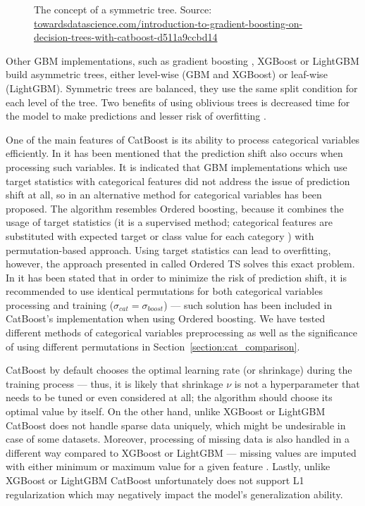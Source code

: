\documentclass[magisterska, english]{pwr_wmat_praca_dyplomowa}
\theoremstyle{plain}
\numberwithin{theorem}{chapter}
\theoremstyle{definition}
\numberwithin{theorem}{chapter}
\begin{document}
\begin{figure}[H]
	\centering
	\caption{The concept of a symmetric tree. Source: \url{towardsdatascience.com/introduction-to-gradient-boosting-on-decision-trees-with-catboost-d511a9ccbd14}}
	\label{fig:symmetric_trees}
\end{figure}

Other GBM implementations, such as gradient boosting \cite{friedman_gbm}, XGBoost \cite{xgboost} or LightGBM \cite{lightgbm} build asymmetric trees, either level-wise (GBM and XGBoost) or leaf-wise (LightGBM). Symmetric trees are balanced, they use the same split condition for each level of the tree. Two benefits of using oblivious trees is decreased time for the model to make predictions and lesser risk of overfitting \cite{catboost}. 

One of the main features of CatBoost is its ability to process categorical variables efficiently. In \cite{catboost} it has been mentioned that the prediction shift also occurs when processing such variables. It is indicated that GBM implementations which use target statistics with categorical features did not address the issue of prediction shift at all, so in \cite{catboost} an alternative method for categorical variables has been proposed. The algorithm resembles Ordered boosting, because it combines the usage of target statistics (it is a supervised method; categorical features are substituted with expected target or class value for each category \cite{comparative_analysis}) with permutation-based approach. Using target statistics can lead to overfitting, however, the approach presented in \cite{catboost} called Ordered TS solves this exact problem. In \cite{catboost} it has been stated that in order to minimize the risk of prediction shift, it is recommended to use identical permutations for both categorical variables processing and training ($\sigma_{cat} = \sigma_{boost}$) --- such solution has been included in CatBoost's implementation when using Ordered boosting. We have tested different methods of categorical variables preprocessing as well as the significance of using different permutations in Section~\ref{section:cat_comparison}.

CatBoost by default chooses the optimal learning rate (or shrinkage) during the training process --- thus, it is likely that shrinkage $\nu$ is not a hyperparameter that needs to be tuned or even considered at all; the algorithm should choose its optimal value by itself. On the other hand, unlike XGBoost or LightGBM CatBoost does not handle sparse data uniquely, which might be undesirable in case of some datasets. Moreover, processing of missing data is also handled in a different way compared to XGBoost or LightGBM --- missing values are imputed with either minimum or maximum value for a given feature \cite{catboost}. Lastly, unlike XGBoost or LightGBM CatBoost unfortunately does not support L1 regularization which may negatively impact the model's generalization ability.
\end{document}
